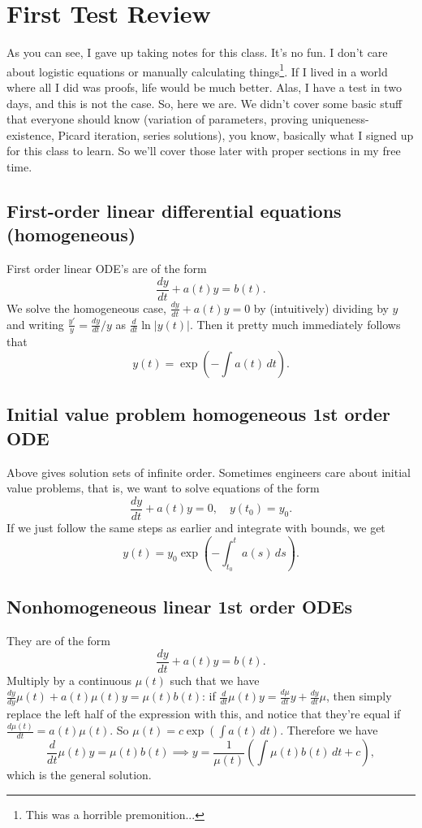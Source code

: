 \section{First Test Review}
As you can see, I gave up taking notes for this class. It's no fun. I don't care about logistic equations or manually calculating things\footnote{This was a horrible premonition...}. If I lived in a world where all I did was proofs, life would be much better. Alas, I have a test in two days, and this is not the case. So, here we are.
\orbreak
We didn't cover some basic stuff that everyone should know (variation of parameters, proving uniqueness-existence, Picard iteration, series solutions), you know, basically what I signed up for this class to learn. So we'll cover those later with proper sections in my free time.
\subsection{First-order linear differential equations (homogeneous)}
First order linear ODE's are of the form 
\begin{equation}
    \frac{dy}{dt}+a(t)y=b(t).
\end{equation}
We solve the homogeneous case, $\frac{dy}{dt}+a(t)y=0$ by (intuitively) dividing by $y$ and writing $\frac{y'}{y}=\frac{dy}{dt}/y$ as $\frac{d}{dt} \ln|y(t)|$. Then it pretty much immediately follows that \[
    y(t)=\exp \left( -\int a(t) \, dt \right) .
\] 
\subsection{Initial value problem homogeneous 1st order ODE}
Above gives solution sets of infinite order. Sometimes engineers care about initial value problems, that is, we want to solve equations of the form 
\begin{equation}
    \frac{dy}{dt}+a(t)y=0,\quad y(t_0)=y_0.
\end{equation}
If we just follow the same steps as earlier and integrate with bounds, we get 
\[
    y(t)=y_0\exp\left( -\int_{t_0}^{t} a(s) \, ds \right) .
\] 
\subsection{Nonhomogeneous linear 1st order ODEs}
They are of the form
\begin{equation}
    \frac{dy}{dt}+a(t)y=b(t).
\end{equation}
Multiply by a continuous $\mu(t)$ such that we have $\frac{dy}{dy}\mu(t)+a(t)\mu(t)y=\mu(t)b(t)$: if $\frac{d}{dt} \mu(t)y=\frac{d\mu}{dt}y+\frac{dy}{dt}\mu$, then simply replace the left half of the expression with this, and notice that they're equal if $ \frac{d\mu(t)}{dt}=a(t)\mu(t)$. So $\mu(t)=c\exp\left( \int a(t) \, dt \right) $. Therefore we have \[
    \frac{d}{dt} \mu(t)y=\mu(t)b(t) \implies y=\frac{1}{\mu(t)}\left( \int \mu(t)b(t) \, dt +c\right),
\] which is the general solution.
